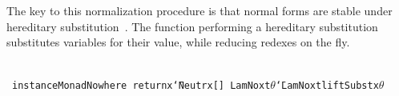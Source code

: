 \documentclass[9pt,authoryear]{sigplanconf}
\begin{document}
%
The key to this normalization procedure is that normal forms
    are stable under hereditary substitution{~}\cite{nanevski-08}.
    The function performing a hereditary substitution substitutes
    variables for their value, while reducing redexes on the fly.%


{\nopagebreak }

%
%
%
~\\~\vphantom{$\{$}\texttt{instance}\texttt{\mbox{\hspace{0.50em}}}\texttt{Monad}\texttt{\mbox{\hspace{0.50em}}}\texttt{No}\texttt{\mbox{\hspace{0.50em}}}\texttt{where}\texttt{{\nopagebreak \newline%
}\vphantom{$\{$}}\texttt{\mbox{\hspace{0.50em}}}\texttt{\mbox{\hspace{0.50em}}}\texttt{return}\texttt{\mbox{\hspace{0.50em}}}\texttt{x}\texttt{\mbox{\hspace{0.50em}}}\texttt{{\char `\=}}\texttt{\mbox{\hspace{0.50em}}}\texttt{Neutr}\texttt{\mbox{\hspace{0.50em}}}\texttt{x}\texttt{\mbox{\hspace{0.50em}}}\texttt{{[}}\texttt{{]}}\texttt{{\nopagebreak \newline%
}\vphantom{$\{$}}\texttt{\mbox{\hspace{0.50em}}}\texttt{\mbox{\hspace{0.50em}}}\texttt{LamNo}\texttt{\mbox{\hspace{0.50em}}}\texttt{x}\texttt{\mbox{\hspace{0.50em}}}\texttt{t}\texttt{\mbox{\hspace{0.50em}}}\texttt{\mbox{\hspace{0.50em}}}\texttt{\makebox[1.22ex][c]{\textgreater{}}}\texttt{\mbox{\hspace{0.50em}}}\texttt{$ \theta $}\texttt{\mbox{\hspace{0.50em}}}\texttt{{\char `\=}}\texttt{\mbox{\hspace{0.50em}}}\texttt{LamNo}\texttt{\mbox{\hspace{0.50em}}}\texttt{x}\texttt{\mbox{\hspace{0.50em}}}\texttt{\makebox[1.22ex][l]{$ {(} $}}\texttt{t}\texttt{\mbox{\hspace{0.50em}}}\texttt{\makebox[1.22ex][c]{\textgreater{}}}\texttt{\mbox{\hspace{0.50em}}}\texttt{liftSubst}\texttt{\mbox{\hspace{0.50em}}}\texttt{x}\texttt{\mbox{\hspace{0.50em}}}\texttt{$ \theta $}\texttt{\makebox[1.22ex][r]{$ {)} $}}\texttt{{\nopagebreak \newline%
}}
\end{document}
